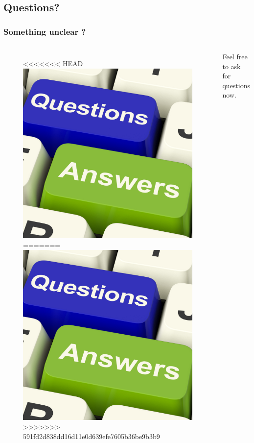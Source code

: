 \documentclass{beamer}
\begin{document}
\subsection{Questions?}
\begin{frame}
\frametitle{Something unclear ?}
\begin{columns}[c]
\begin{figure}
<<<<<<< HEAD
\includegraphics[width=0.8\linewidth]{./materials/questions.jpg}
=======
\includegraphics[width=0.8\linewidth]{./materials/questions}
>>>>>>> 591fd2d838dd16d11e0d639efe7605b36be9b3b9
\end{figure}
Feel free to ask for questions now.
\end{columns}
\end{frame}
\end{document}
